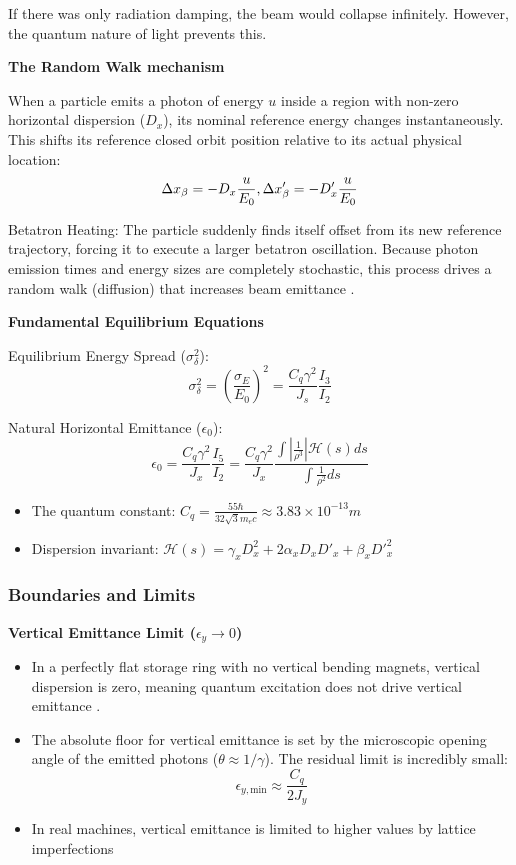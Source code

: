 \documentclass{article}
\begin{document}
If there was only radiation damping, the beam would collapse infinitely. However, the quantum nature of light prevents this.

\textbf{The Random Walk mechanism}

When a particle emits a photon of energy $u$ inside a region with non-zero horizontal dispersion ($D_x$), its nominal reference energy changes instantaneously. This shifts its reference closed orbit position relative to its actual physical location:
$$\Delta x_\beta=-D_x \frac{u}{E_0},\space \Delta x'_\beta =-D'_x\frac{u}{E_0}$$

Betatron Heating: The particle suddenly finds itself offset from its new reference trajectory, forcing it to execute a larger betatron oscillation. Because photon emission times and energy sizes are completely stochastic, this process drives a random walk (diffusion) that increases beam emittance \cite{Wolski2014,Wiedemann2015}.

\textbf{Fundamental Equilibrium Equations}

Equilibrium Energy Spread ($\sigma_\delta^2$):
$$\sigma_\delta^2=(\frac{\sigma_E}{E_0})^2 =\frac{C_q\gamma^2}{J_s}\frac{I_3}{I_2}$$

Natural Horizontal Emittance ($\epsilon_0$):
$$\epsilon_0=\frac{C_q\gamma^2}{J_x}\frac{I_5}{I_2}=\frac{C_q\gamma^2}{J_x}\frac{\int |\frac{1}{\rho^3}| \mathcal{H}(s) ds}{\int \frac{1}{\rho^2} ds}$$

\begin{itemize}
\item The quantum constant: $C_q=\frac{55\hbar}{32\sqrt{3}m_e c}\approx 3.83\times 10^{-13} m$ \cite{Sands1970}
\item Dispersion invariant: $\mathcal{H}(s)=\gamma_x D_x^2 +2\alpha_x D_x D'_x +\beta_x D'^2_x$ \cite{Wolski2014}
\end{itemize}

\subsubsection{Boundaries and Limits}
\textbf{Vertical Emittance Limit ($\epsilon_y \rightarrow 0$)}

\begin{itemize}
\item In a perfectly flat storage ring with no vertical bending magnets, vertical dispersion is zero, meaning quantum excitation does not drive vertical emittance \cite{Wolski2014}.
\item The absolute floor for vertical emittance is set by the microscopic opening angle of the emitted photons ($\theta \approx 1/\gamma$). The residual limit is incredibly small:$$\epsilon_{y,\text{min}}\approx \frac{C_q}{2J_y}$$
\item In real machines, vertical emittance is limited to higher values by lattice imperfections \cite{Wiedemann2015}
\end{itemize}
\end{document}
